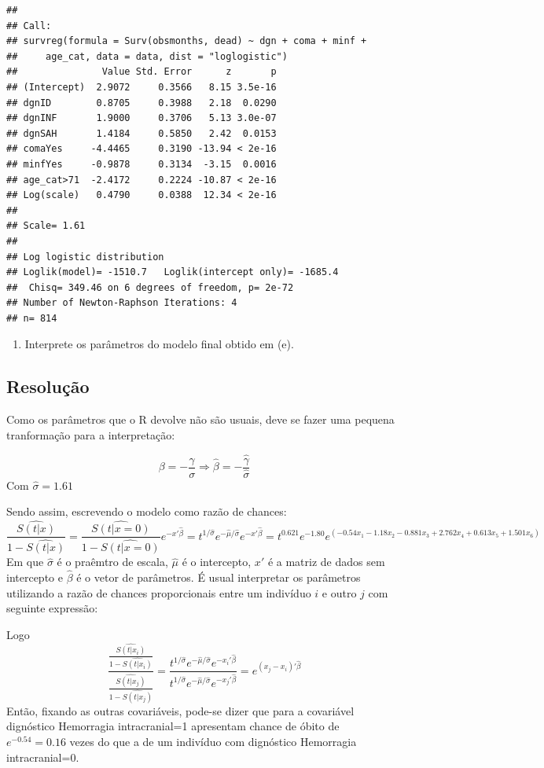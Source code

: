 \documentclass[]{article}
\providecommand{\tightlist}{%
  \setlength{\itemsep}{0pt}\setlength{\parskip}{0pt}}
\begin{document}
\begin{verbatim}
## 
## Call:
## survreg(formula = Surv(obsmonths, dead) ~ dgn + coma + minf + 
##     age_cat, data = data, dist = "loglogistic")
##               Value Std. Error      z       p
## (Intercept)  2.9072     0.3566   8.15 3.5e-16
## dgnID        0.8705     0.3988   2.18  0.0290
## dgnINF       1.9000     0.3706   5.13 3.0e-07
## dgnSAH       1.4184     0.5850   2.42  0.0153
## comaYes     -4.4465     0.3190 -13.94 < 2e-16
## minfYes     -0.9878     0.3134  -3.15  0.0016
## age_cat>71  -2.4172     0.2224 -10.87 < 2e-16
## Log(scale)   0.4790     0.0388  12.34 < 2e-16
## 
## Scale= 1.61 
## 
## Log logistic distribution
## Loglik(model)= -1510.7   Loglik(intercept only)= -1685.4
##  Chisq= 349.46 on 6 degrees of freedom, p= 2e-72 
## Number of Newton-Raphson Iterations: 4 
## n= 814
\end{verbatim}

\newpage

\begin{enumerate}
\def\labelenumi{(\alph{enumi})}
\setcounter{enumi}{5}
\tightlist
\item
  Interprete os parâmetros do modelo final obtido em (e).
\end{enumerate}

\subsection{Resolução}\label{resolucao-5}

Como os parâmetros que o R devolve não são usuais, deve se fazer uma
pequena tranformação para a interpretação:

\[\beta=-\frac{\gamma}{\sigma} \Rightarrow \hat\beta=-\frac{\hat\gamma}{\hat\sigma}\]
Com \(\hat\sigma=1.61\)

Sendo assim, escrevendo o modelo como razão de chances:
\[\frac{\widehat {S(t|x)}}{1-\widehat {S(t|x)}}=\frac{\widehat {S(t|x=0)}}{1-\widehat {S(t|x=0)}}e^{-x'\hat\beta}=t^{1/\hat\sigma}e^{-\hat\mu/\hat\sigma}e^{-x'\hat\beta}=t^{0.621}e^{-1.80}e^{(-0.54x_1 -1.18x_2 -0.881x_3 +2.762x_4 +0.613x_5 + 1.501x_6)}\]
Em que \(\hat\sigma\) é o praêmtro de escala, \(\hat\mu\) é o
intercepto, \(x'\) é a matriz de dados sem intercepto e \(\hat\beta\) é
o vetor de parâmetros. É usual interpretar os parâmetros utilizando a
razão de chances proporcionais entre um indivíduo \(i\) e outro \(j\)
com seguinte expressão:

Logo
\[\frac{\frac{\widehat {S(t|x_i)}}{1-\widehat {S(t|x_i)}}}{\frac{\widehat {S(t|x_j)}}{1-\widehat {S(t|x_j)}}}=\frac{t^{1/\hat\sigma}e^{-\hat\mu/\hat\sigma}e^{-x_i'\hat\beta}}{t^{1/\hat\sigma}e^{-\hat\mu/\hat\sigma}e^{-x_j'\hat\beta}}=e^{(x_j-x_i)'\hat\beta}\]
Então, fixando as outras covariáveis, pode-se dizer que para a
covariável dignóstico Hemorragia intracranial=1 apresentam chance de
óbito de \(e^{-0.54}=0.16\) vezes do que a de um indivíduo com
dignóstico Hemorragia intracranial=0.
\end{document}
